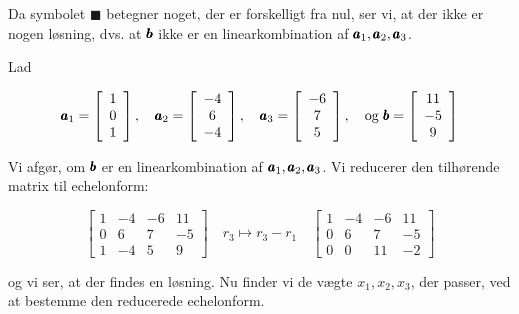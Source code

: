 \begin{example}
Da symbolet $\blacksquare$ betegner noget, der er forskelligt fra nul, ser vi, at der ikke er nogen løsning, dvs. at $\pmb{b}$ ikke er en linearkombination af $\pmb{a}_1, \pmb{a}_2, \pmb{a}_3$.

\end{example}

\begin{example} Lad

\[
\pmb{a}_1 = \left[\begin{array}{l}
1 \\
0 \\
1
\end{array}\right], \quad
\pmb{a}_2 = \left[\begin{array}{c}
-4 \\
6 \\
-4
\end{array}\right], \quad
\pmb{a}_3 = \left[\begin{array}{c}
-6 \\
7 \\
5
\end{array}\right], \quad
\text{og } \pmb{b} = \left[\begin{array}{c}
11 \\
-5 \\
9
\end{array}\right]
\]

Vi afgør, om $\pmb{b}$ er en linearkombination af $\pmb{a}_1, \pmb{a}_2, \pmb{a}_3$. Vi reducerer den tilhørende matrix til echelonform:

\[
\left[\begin{array}{cccc}
1 & -4 & -6 & 11 \\
0 & 6 & 7 & -5 \\
1 & -4 & 5 & 9
\end{array}\right]
\quad r_3 \mapsto r_3 - r_1 \quad
\left[\begin{array}{cccc}
1 & -4 & -6 & 11 \\
0 & 6 & 7 & -5 \\
0 & 0 & 11 & -2
\end{array}\right]
\]

og vi ser, at der findes en løsning. Nu finder vi de vægte $x_1, x_2, x_3$, der passer, ved at bestemme den reducerede echelonform.


\end{example}
